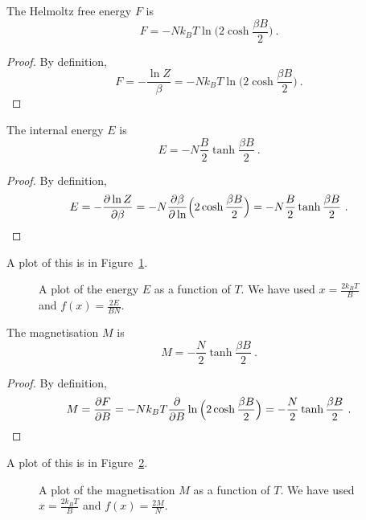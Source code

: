     The Helmoltz free energy $F$ is 
    \begin{equation*}
        F = - N k_B T \ln \Big ( 2 \cosh \frac{\beta B}{2} \Big) ~.
    \end{equation*}
    \begin{proof}
        By definition, 
        \begin{equation*}
            F = - \frac{\ln Z}{\beta} = - N k_B T \ln \Big ( 2 \cosh \frac{\beta B}{2} \Big) ~.
        \end{equation*}
    \end{proof}

    The internal energy $E$ is 
    \begin{equation*}
        E = - N \frac{B}{2} \tanh \frac{\beta B}{2} ~.
    \end{equation*}
    \begin{proof}
        By definition, 
        \begin{equation*}
            E = - \frac{\partial\ln Z}{\partial\beta} = - N \frac{\partial\beta}{\partial\ln} \Big (2 \cosh \frac{\beta B}{2} \Big) = - N \frac{B}{2} \tanh \frac{\beta B}{2} ~.
        \end{equation*}
    \end{proof}
    A plot of this is in Figure~\ref{qm:e}.
    \begin{figure}
        \centering
        \caption{A plot of the energy $E$ as a function of $T$. We have used $x = \frac{2 k_B T}{B} $ and $f(x) = \frac{2E}{BN}$.}
        \label{qm:e}
    \end{figure}

    The magnetisation $M$ is 
    \begin{equation*}
        M = - \frac{N}{2} \tanh \frac{\beta B}{2} ~. 
    \end{equation*}
    \begin{proof}
        By definition, 
        \begin{equation*}
            M = \frac{\partial F}{\partial B} = - N k_B T \frac{\partial}{\partial B} \ln \Big ( 2 \cosh \frac{\beta B}{2} \Big) = - \frac{N}{2} \tanh \frac{\beta B}{2} ~.
        \end{equation*}
    \end{proof}
    A plot of this is in Figure~\ref{qm:m}.
    \begin{figure}
        \centering
        \caption{A plot of the magnetisation $M$ as a function of $T$. We have used $x = \frac{2 k_B T}{B} $ and $f(x) = \frac{2M}{N}$.}
        \label{qm:m}
    \end{figure}

